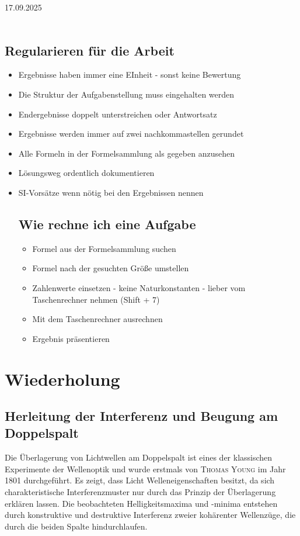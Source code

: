 \documentclass[11pt,a4paper,oneside]{article}
\newcommand{\lessondate}[1]{\noindent\hfill\textcolor{MarginalGray}{\textsc{#1}} \\ \vspace{0.5cm}}
\begin{document}
	\newpage
	
	\lessondate{17.09.2025}\\
	\subsection*{Regularieren für die Arbeit}
	\begin{itemize}
		\item Ergebnisse haben immer eine EInheit - sonst keine Bewertung 
		\item Die Struktur der Aufgabenstellung muss eingehalten werden 
		\item Endergebnisse doppelt unterstreichen oder Antwortsatz 
		\item Ergebnisse werden immer auf zwei nachkommastellen gerundet 
		\item Alle Formeln in der Formelsammlung als gegeben anzusehen 
		\item Lösungsweg ordentlich dokumentieren 
		\item SI-Vorsätze wenn nötig bei den Ergebnissen nennen
		\subsection*{Wie rechne ich eine Aufgabe}
		\begin{itemize}
			\item Formel aus der Formelsammlung suchen 
			\item Formel nach der gesuchten Größe umstellen 
			\item Zahlenwerte einsetzen - keine Naturkonstanten - lieber vom Taschenrechner nehmen (Shift + 7)
			\item Mit dem Taschenrechner ausrechnen 
			\item Ergebnis präsentieren 
		\end{itemize}
	\end{itemize}
	
	
	
	\newpage
	
	\section{Wiederholung}
	
	\subsection{Herleitung der Interferenz und Beugung am Doppelspalt}
	Die Überlagerung von Lichtwellen am Doppelspalt ist eines der klassischen Experimente der Wellenoptik und wurde erstmals von \textsc{Thomas Young} im Jahr 1801 durchgeführt. Es zeigt, dass Licht Welleneigenschaften besitzt, da sich charakteristische Interferenzmuster nur durch das Prinzip der Überlagerung erklären lassen. Die beobachteten Helligkeitsmaxima und -minima entstehen durch konstruktive und destruktive Interferenz zweier kohärenter Wellenzüge, die durch die beiden Spalte hindurchlaufen.
	
\end{document}
